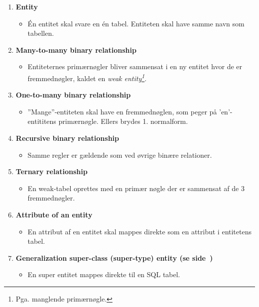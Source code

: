 \begin{enumerate}
	\item \textbf{Entity}
	\begin{itemize}
		\item Én entitet skal svare en én tabel. Entiteten skal have samme navn som tabellen.
	\end{itemize}
	
	\item \textbf{Many-to-many binary relationship}
	\begin{itemize}
		\item Entiteternes primærnøgler bliver sammensat i en ny entitet hvor de er fremmednøgler, kaldet en \textit{weak entity\footnote{Pga. manglende primærnøgle.}}.
	\end{itemize}
	
	\item \textbf{One-to-many binary relationship}
	\begin{itemize}
		\item ''Mange''-entiteten skal have en fremmednøglen, som peger på 'en'-entititens primærnøgle. Ellers brydes 1. normalform.
	\end{itemize}
			
	\item \textbf{Recursive binary relationship}
	\begin{itemize}
		\item Samme regler er gældende som ved øvrige binære relationer.
	\end{itemize}
	
	\item \textbf{Ternary relationship}
	\begin{itemize}
		\item En weak-tabel oprettes med en primær nøgle der er sammensat af de 3 fremmednøgler.
	\end{itemize}
	
	\item \textbf{Attribute of an entity}
	\begin{itemize}
		\item En attribut af en entitet skal mappes direkte som en attribut i entitetens tabel.
	\end{itemize}
	
	\item \textbf{Generalization super-class (super-type) entity (se side~\pageref{sec:arv})}
	\begin{itemize}
		\item En super entitet mappes direkte til en SQL tabel.
	\end{itemize}
	

\end{enumerate}
